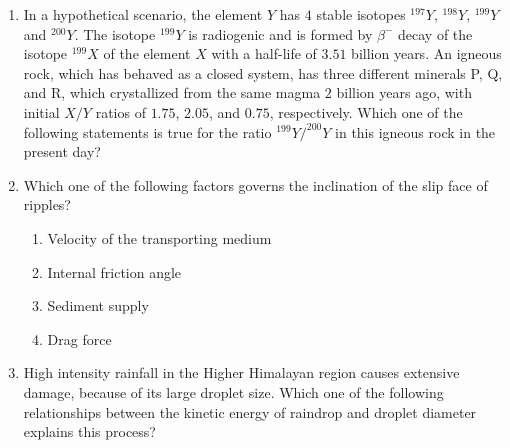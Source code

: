\documentclass[journal,12pt,onecolumn]{IEEEtran}
\theoremstyle{remark}
\begin{document}
\begin{enumerate}
\item In a hypothetical scenario, the element $Y$ has $4$ stable isotopes $^{197}Y$, $^{198}Y$, $^{199}Y$ and $^{200}Y$. The isotope $^{199}Y$ is radiogenic and is formed by $\beta^-$ decay of the isotope $^{199}X$ of the element $X$ with a half-life of $3.51$ billion years. An igneous rock, which has behaved as a closed system, has three different minerals P, Q, and R, which crystallized from the same magma $2$ billion years ago, with initial $X/Y$ ratios of $1.75$, $2.05$, and $0.75$, respectively. Which one of the following statements is true for the ratio $^{199}Y/^{200}Y$ in this igneous rock in the present day? \hfill{}
\begin{enumerate}
\end{enumerate}

\item Which one of the following factors governs the inclination of the slip face  of ripples? \hfill{}
\begin{enumerate}
    \item Velocity of the transporting medium
    \item Internal friction angle
    \item Sediment supply
    \item Drag force
\end{enumerate}

\item High intensity rainfall in the Higher Himalayan region causes extensive damage, because of its large droplet size. Which one of the following relationships between the kinetic energy of raindrop  and droplet diameter  explains this process? \hfill{}
\begin{enumerate}
\end{enumerate}


\end{enumerate}
\end{document}
